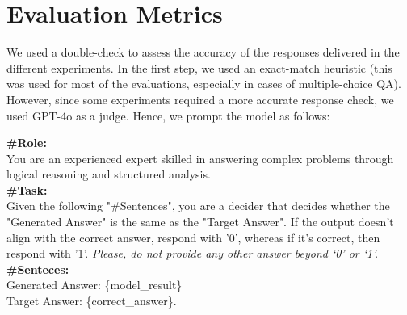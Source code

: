 \documentclass[11pt]{article}
\begin{document}
\begin{table}[]
\section{Evaluation Metrics}
\label{app:LLM_evaluator}

We used a double-check to assess the accuracy of the responses delivered in the different experiments. In the first step, we used an exact-match heuristic (this was used for most of the evaluations, especially in cases of multiple-choice QA). However, since some experiments required a more accurate response check, we used GPT-4o as a judge. Hence, we prompt the model as follows:

\begin{tcolorbox}[
    colback=lightgray,
    colframe=gray!75!black,
    colbacktitle=gray!90!white,
    fonttitle=\bfseries,
    width=\columnwidth,
    boxrule=0.5pt,
    arc=4pt,
    auto outer arc,
]
\small
\textbf{\#Role:} \\
You are an experienced expert skilled in answering complex problems through logical reasoning and structured
analysis. \\
\textbf{\#Task:} \\
Given the following "\#Sentences", you are a decider that decides whether the "Generated Answer" is the same as the "Target Answer". 
If the output doesn't align with the correct answer, respond with '0', whereas if it's correct, then respond with '1'. \textit{Please, do not provide any other answer beyond `0' or `1'.} \\
\textbf{\#Senteces:} \\
Generated Answer: \{model\_result\} \\
Target Answer: \{correct\_answer\}. \\
\end{tcolorbox}
\label{tab:prompt_answer_evaluation}
\end{table}
\end{document}
